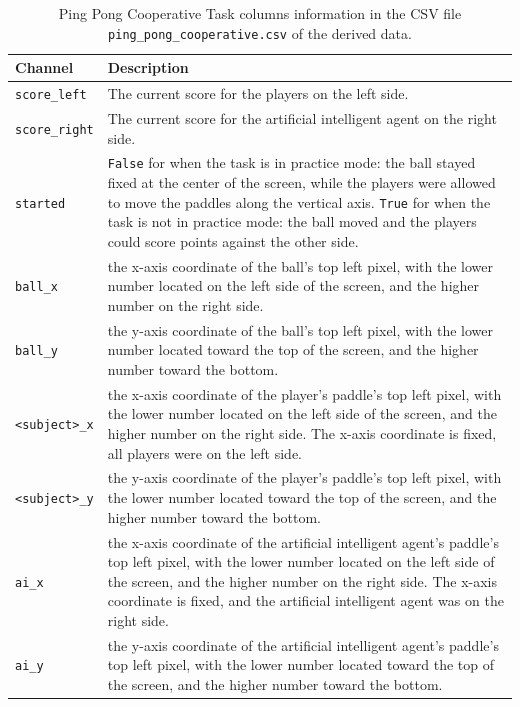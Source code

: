 \begin{table}[h]
\centering
\begin{tabularx}{\textwidth}{|l|X|}
\hline
\textbf{Channel} & \textbf{Description} \\
\hline
\texttt{score\_left} & The current score for the players on the left side.\\
\hline
\texttt{score\_right} & The current score for the artificial intelligent agent on the right side.\\
\hline
\texttt{started} & \texttt{False} for when the task is in practice mode: the ball stayed fixed at the center of the screen, while the players were allowed to move the paddles along the vertical axis. \texttt{True} for when the task is not in practice mode: the ball moved and the players could score points against the other side.\\
\hline
\texttt{ball\_x} & the x-axis coordinate of the ball's top left pixel, with the lower number located on the left side of the screen, and the higher number on the right side.\\
\hline
\texttt{ball\_y} & the y-axis coordinate of the ball's top left pixel, with the lower number located toward the top  of the screen, and the higher number toward the bottom.\\
\hline
\texttt{<subject>\_x} & the x-axis coordinate of the player's paddle's top left pixel, with the lower number located on the left side of the screen, and the higher number on the right side. The x-axis coordinate is fixed, all players were on the left side.\\
\hline
\texttt{<subject>\_y} & the y-axis coordinate of the player's paddle's top left pixel, with the lower number located toward the top of the screen, and the higher number toward the bottom.\\
\hline
\texttt{ai\_x} & the x-axis coordinate of the artificial intelligent agent's paddle's top left pixel, with the lower number located on the left side of the screen, and the higher number on the right side. The x-axis coordinate is fixed, and the artificial intelligent agent was on the right side.\\
\hline
\texttt{ai\_y} & the y-axis coordinate of the artificial intelligent agent's paddle's top left pixel, with the lower number located toward the top of the screen, and the higher number toward the bottom.\\
\hline
\end{tabularx}
\caption{Ping Pong Cooperative Task columns information in the CSV file \texttt{ping\_pong\_cooperative.csv} of the derived data.}
\label{tab:ping_pong_cooperative_task_columns}
\end{table}

